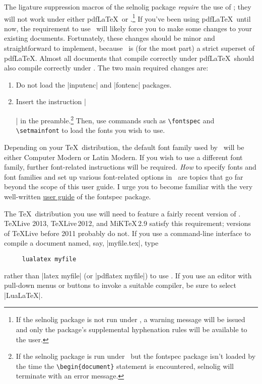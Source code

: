 \documentclass[11pt]{article}
\newcommand{\pkg}[1]{\textsf{#1}}
\newcommand{\cmmd}[1]{\texttt{\textbackslash #1}}
\begin{document}
\begingroup
\renewcommand\theenumi{(\roman{enumi})}
\renewcommand\labelenumi\theenumi

The ligature suppression macros of the \pkg{selnolig} package \emph{require} the use of \LuaLaTeX; they will not work under either pdf\LaTeX\ or \XeLaTeX.\footnote{If the \pkg{selnolig} package is not run under \LuaLaTeX, a warning message will be issued and only the package's supplemental hyphenation rules will be available to the user.}
If you've been using pdf\LaTeX\ until now, the requirement to use \LuaLaTeX\ will likely force you to make some changes to your existing documents. Fortunately, these changes should be minor and straightforward to implement, because \LuaLaTeX\ is (for the most part) a strict superset of pdf\LaTeX. Almost all documents that compile correctly under pdf\LaTeX\ should also compile correctly under \LuaLaTeX.
The two main required changes are: 
\begin{enumerate}
\item Do not load the |inputenc| and |fontenc| packages. \item Insert the instruction |\usepackage{fontspec}|
in the preamble.\footnote{If the \pkg{selnolig} package is run under \LuaLaTeX\ but the \pkg{fontspec} package isn't loaded by the time the \Verb+\begin{document}+ statement is encountered, \pkg{selnolig} will terminate with an error message.} Then, use commands such as \cmmd{fontspec} and \cmmd{setmainfont} to load the fonts you wish to use.
\end{enumerate}
\endgroup


Depending on your \TeX\ distribution, the default font family used by \LuaLaTeX\ will be either Computer Modern or Latin Modern. If you wish to use a different font family, further font-related instructions will be required. \emph{How} to specify fonts and font families and set up various font-related options in \LuaLaTeX\ are topics that go far beyond the scope of this user guide. I urge you to become familiar with the very well-written
 \href{http://www.ctan.org/tex-archive/macros/latex/contrib/fontspec/fontspec.pdf}{user guide} of the \pkg{fontspec} package.

The \TeX\ distribution you use will need to feature a fairly recent version of \LuaLaTeX. \TeX Live 2013, \TeX Live\,2012, and MiK\TeX\,2.9 satisfy this requirement; versions of \TeX Live before 2011 probably do not. If you use a command-line interface to compile a document named, say, |myfile.tex|, type 
\begin{Verbatim}
     lualatex myfile
\end{Verbatim}
rather than |latex myfile| (or |pdflatex myfile|) to use \LuaLaTeX. If you use an editor with pull-down menus or buttons to invoke a suitable compiler, be sure to select |LuaLaTeX|. 
\end{document}
